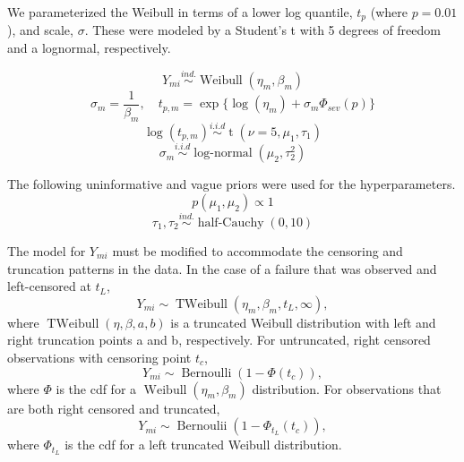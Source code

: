 \documentclass{scrartcl}
\begin{document}
We parameterized the Weibull in terms of a lower log quantile, $t_p$ (where $p=0.01$), and scale, $\sigma$. These were modeled by a Student's t with 5 degrees of freedom and a lognormal, respectively.

\[Y_{mi} \stackrel{ind.}{\sim} \operatorname{Weibull}(\eta_m, \beta_m)\]
\[\sigma_m = \frac{1}{\beta_m}, \quad t_{p,m} = \exp\{\log(\eta_m) + \sigma_m \Phi_{sev}(p)\}\]
\[\log(t_{p,m}) \stackrel{i.i.d}{\sim} \operatorname{t}(\nu = 5, \mu_1, \tau_1)\]
\[\sigma_m \stackrel{i.i.d}{\sim} \operatorname{log-normal}(\mu_2, \tau^2_2)\]

The following uninformative and vague priors were used for the hyperparameters.
\[p(\mu_1,\mu_2) \propto 1\]
\[\tau_1,\tau_2 \stackrel{ind.}{\sim} \operatorname{half-Cauchy}(0,10)\]

The model for $Y_{mi}$ must be modified to accommodate the censoring and truncation patterns in the data. In the case of a failure that was observed and left-censored at $t_L$,
\[Y_{mi} \sim \operatorname{TWeibull}(\eta_m, \beta_m, t_L, \infty),\]
where $\operatorname{TWeibull}(\eta,\beta,a,b)$ is a truncated Weibull distribution with left and right truncation points a and b, respectively. For untruncated, right censored observations with censoring point $t_c$,
\[Y_{mi} \sim \operatorname{Bernoulli}(1-\Phi(t_c)),\]
where $\Phi$ is the cdf for a $\operatorname{Weibull}(\eta_m,\beta_m)$ distribution.
For observations that are both right censored and truncated,
\[Y_{mi} \sim \operatorname{Bernoulii}(1-\Phi_{t_L}(t_c)),\]
where $\Phi_{t_L}$ is the cdf for a left truncated Weibull distribution. 
\end{document}
